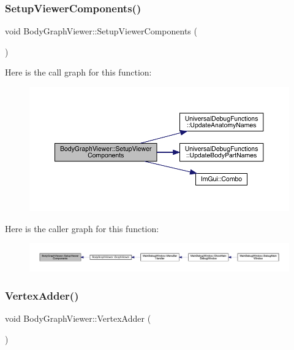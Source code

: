 \subsubsection{\texorpdfstring{Setup\+Viewer\+Components()}{SetupViewerComponents()}}
{\footnotesize\ttfamily void Body\+Graph\+Viewer\+::\+Setup\+Viewer\+Components (\begin{DoxyParamCaption}{ }\end{DoxyParamCaption})}

Here is the call graph for this function\+:
\nopagebreak
\begin{figure}[H]
\begin{center}
\leavevmode
\includegraphics[width=350pt]{df/d9e/namespace_body_graph_viewer_ae2458c73737cf4926078c6415ee2087b_cgraph}
\end{center}
\end{figure}
Here is the caller graph for this function\+:
\nopagebreak
\begin{figure}[H]
\begin{center}
\leavevmode
\includegraphics[width=350pt]{df/d9e/namespace_body_graph_viewer_ae2458c73737cf4926078c6415ee2087b_icgraph}
\end{center}
\end{figure}
\mbox{\label{namespace_body_graph_viewer_a84ae9cb3a7a4441cd2f55037b98ddcaf}} 
\subsubsection{\texorpdfstring{Vertex\+Adder()}{VertexAdder()}}
{\footnotesize\ttfamily void Body\+Graph\+Viewer\+::\+Vertex\+Adder (\begin{DoxyParamCaption}{ }\end{DoxyParamCaption})}

